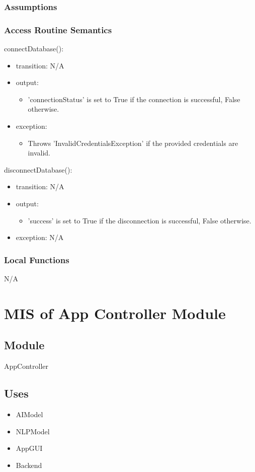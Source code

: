 \documentclass[12pt, titlepage]{article}
\begin{document}
\subsubsection{Assumptions}

\subsubsection{Access Routine Semantics}

\noindent connectDatabase():
\begin{itemize}
\item transition: N/A 
\item output: \begin{itemize}
    \item 'connectionStatus' is set to True if the connection is successful, False otherwise.
\end{itemize}
\item exception: \begin{itemize}
    \item Throws 'InvalidCredentialsException' if the provided credentials are invalid.
\end{itemize}
\end{itemize}

\noindent disconnectDatabase():
\begin{itemize}
\item transition: N/A 
\item output: \begin{itemize}
    \item 'success' is set to True if the disconnection is successful, False otherwise.
\end{itemize} 
\item exception: N/A 
\end{itemize}

\subsubsection{Local Functions}
N/A
\newpage

\section{MIS of App Controller Module} \label{Module} 
\subsection{Module}
AppController
\subsection{Uses}
\begin{itemize}
    \item AIModel
    \item NLPModel
    \item AppGUI
    \item Backend
\end{itemize}
\end{document}
